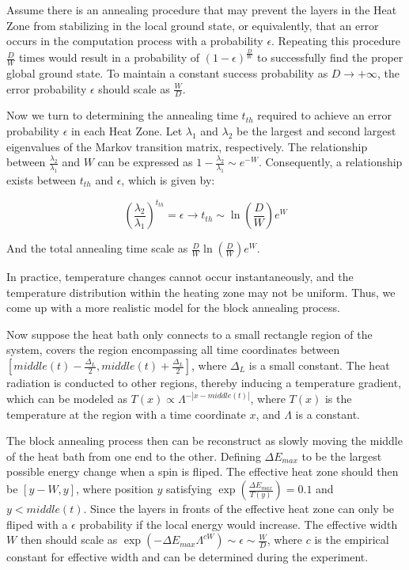 \documentclass[twocolumn,superscriptaddress,english,showpacs,longbibliography]{revtex4-2}
\begin{document}
Assume there is an annealing procedure that may prevent the layers in the Heat Zone from stabilizing in the local ground state, or equivalently, that an error occurs in the computation process with a probability $\epsilon$. Repeating this procedure $\frac{D}{W}$ times would result in a probability of $(1-\epsilon)^{\frac{D}{W}}$ to successfully find the proper global ground state. To maintain a constant success probability as $D \rightarrow +\infty$, the error probability $\epsilon$ should scale as $\frac{W}{D}$.

Now we turn to determining the annealing time $t_{th}$ required to achieve an error probability $\epsilon$ in each Heat Zone. Let $\lambda_1$ and $\lambda_2$ be the largest and second largest eigenvalues of the Markov transition matrix, respectively. The relationship between $\frac{\lambda_2}{\lambda_1}$ and $W$ can be expressed as $1 - \frac{\lambda_2}{\lambda_1} \sim e^{-W}$. Consequently, a relationship exists between $t_{th}$ and $\epsilon$, which is given by:

\begin{equation}
    \left( \frac{\lambda_2}{\lambda_1} \right) ^ {t_{th}} = \epsilon \rightarrow t_{th} \sim \ln(\frac{D}{W})e^{W}
\end{equation}

And the total annealing time scale as $\frac{D}{W}\ln(\frac{D}{W})e^W$.

In practice, temperature changes cannot occur instantaneously, and the temperature distribution within the heating zone may not be uniform.
Thus, we come up with a more realistic model for the block annealing process.

Now suppose the heat bath only connects to a small rectangle region of the system,
covers the region encompassing all time coordinates between $[middle(t)-\frac{\Delta_L}{2}, middle(t)+\frac{\Delta_L}{2}]$, where $\Delta_L$ is a small constant.
The heat radiation is conducted to other regions, thereby inducing a temperature gradient,
which can be modeled as $T(x) \propto \Lambda^{-|x - middle(t)|}$, where $T(x)$ is the temperature at the region with a time coordinate $x$, and $\Lambda$ is a constant.

The block annealing process then can be reconstruct as slowly moving
the middle of the heat bath from one end to the other. Defining $\Delta E_{max}$ to be the
largest possible energy change when a spin is fliped.
The effective heat zone should then be $[y-W, y]$, where position $y$ satisfying 
$\exp(\frac{\Delta E_{max}}{T(y)}) = 0.1$ and $y<middle(t)$. Since the layers
in fronts of the effective heat zone can only be fliped with a $\epsilon$ probability if the local energy would increase. 
The effective width $W$ then should scale as $\exp(-\Delta E_{max} \Lambda^{cW}) \sim \epsilon \sim \frac{W}{D}$, where $c$ is the empirical constant for effective width and can be determined during the experiment. 
\end{document}
